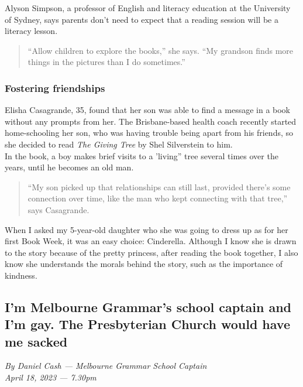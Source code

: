 \documentclass[a4paper]{article}
\begin{document}
Alyson Simpson, a professor of English and literacy education at the University of Sydney, says parents don’t need to expect that a reading session will be a literacy lesson.\\

\begin{quote}
``Allow children to explore the books,'' she says. ``My grandson finds more things in the pictures than I do sometimes.''\\
\end{quote}

\subsubsection*{Fostering friendships}

Elisha Casagrande, 35, found that her son was able to find a message in a book without any prompts from her. The Brisbane-based health coach recently started home-schooling her son, who was having trouble being apart from his friends, so she decided to read \textit{The Giving Tree} by Shel Silverstein to him.\\

In the book, a boy makes brief visits to a 'living” tree several times over the years, until he becomes an old man.\\

\begin{quote}
``My son picked up that relationships can still last, provided there’s some connection over time, like the man who kept connecting with that tree,'' says Casagrande.\\
\end{quote}

When I asked my 5-year-old daughter who she was going to dress up as for her first Book Week, it was an easy choice: Cinderella. Although I know she is drawn to the story because of the pretty princess, after reading the book together, I also know she understands the morals behind the story, such as the importance of kindness.\\

\newpage
\subsection{I’m Melbourne Grammar’s school captain and I’m gay. The Presbyterian Church would have me sacked}

\textit{By Daniel Cash — Melbourne Grammar School Captain\\April 18, 2023 — 7.30pm}
\end{document}
